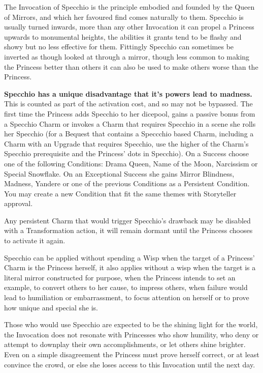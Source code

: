 The Invocation of Specchio is the principle embodied and founded by the Queen of Mirrors, and which her favoured find comes naturally to them. Specchio is usually turned inwards, more than any other Invocation it can propel a Princess upwards to monumental heights, the abilities it grants tend to be flashy and showy but no less effective for them. Fittingly Specchio can sometimes be inverted as though looked at through a mirror, though less common to making the Princess better than others it can also be used to make others worse than the Princess.

\textbf{Specchio has a unique disadvantage that it's powers lead to madness.} This is counted as part of the activation cost, and so may not be bypassed. The first time the Princess adds Specchio to her dicepool, gains a passive bonus from a Specchio Charm or invokes a Charm that requires Specchio in a scene she rolls her Specchio (for a Bequest that contains a Speccchio based Charm, including a Charm with an Upgrade that requires Specchio, use the higher of the Charm's Specchio prerequisite and the Princess' dots in Specchio). On a Success choose one of the following Conditions: Drama Queen, Name of the Moon, Narcissism or Special Snowflake. On an Exceptional Success she gains Mirror Blindness, Madness, Yandere or one of the previous Conditions as a Persistent Condition. You may create a new Condition that fit the same themes with Storyteller approval. 

Any persistent Charm that would trigger Specchio's drawback may be disabled with a Transformation action, it will remain dormant until the Princess chooses to activate it again. 

Specchio can be applied without spending a Wisp when the target of a Princess' Charm is the Princess herself, it also applies without a wisp when the target is a literal mirror constructed for purpose, when the Princess intends to set an example, to convert others to her cause, to impress others, when failure would lead to humiliation or embarrassment, to focus attention on herself or to prove how unique and special she is.

Those who would use Specchio are expected to be the shining light for the world, the Invocation does not resonate with Princesses who show humility, who deny or attempt to downplay their own accomplishments, or let others shine brighter. Even on a simple disagreement the Princess must prove herself correct, or at least convince the crowd, or else she loses access to this Invocation until the next day. 

